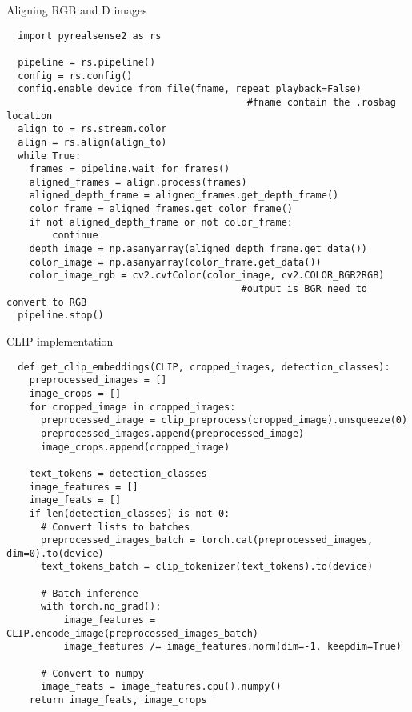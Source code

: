 \documentclass[
  a4paper,  %
  twoside,  %
  bibliography=totoc,
  headsepline,
  cleardoublepage=empty,
  parskip=half,
  draft=false
]{scrbook}
\begin{document}
\begin{listing}[ht]
  \caption{Aligning RGB and D images}
  \label{lst:align}
\begin{lstlisting}
  import pyrealsense2 as rs

  pipeline = rs.pipeline()     
  config = rs.config()
  config.enable_device_from_file(fname, repeat_playback=False) 
                                          #fname contain the .rosbag location
  align_to = rs.stream.color
  align = rs.align(align_to)
  while True:
    frames = pipeline.wait_for_frames()
    aligned_frames = align.process(frames)
    aligned_depth_frame = aligned_frames.get_depth_frame()
    color_frame = aligned_frames.get_color_frame()
    if not aligned_depth_frame or not color_frame:
        continue
    depth_image = np.asanyarray(aligned_depth_frame.get_data())
    color_image = np.asanyarray(color_frame.get_data())
    color_image_rgb = cv2.cvtColor(color_image, cv2.COLOR_BGR2RGB) 
                                         #output is BGR need to convert to RGB
  pipeline.stop()
\end{lstlisting}
\end{listing}
\begin{listing}[ht]
  \caption{ CLIP implementation}
  \label{lst:clipImpl}
\begin{lstlisting}
  def get_clip_embeddings(CLIP, cropped_images, detection_classes):
    preprocessed_images = []
    image_crops = []
    for cropped_image in cropped_images:  
      preprocessed_image = clip_preprocess(cropped_image).unsqueeze(0)
      preprocessed_images.append(preprocessed_image)
      image_crops.append(cropped_image)
    
    text_tokens = detection_classes
    image_features = []
    image_feats = []
    if len(detection_classes) is not 0:
      # Convert lists to batches
      preprocessed_images_batch = torch.cat(preprocessed_images, dim=0).to(device)
      text_tokens_batch = clip_tokenizer(text_tokens).to(device)

      # Batch inference
      with torch.no_grad():
          image_features = CLIP.encode_image(preprocessed_images_batch)
          image_features /= image_features.norm(dim=-1, keepdim=True)

      # Convert to numpy
      image_feats = image_features.cpu().numpy()
    return image_feats, image_crops
\end{lstlisting}
\end{listing}
\end{document}
